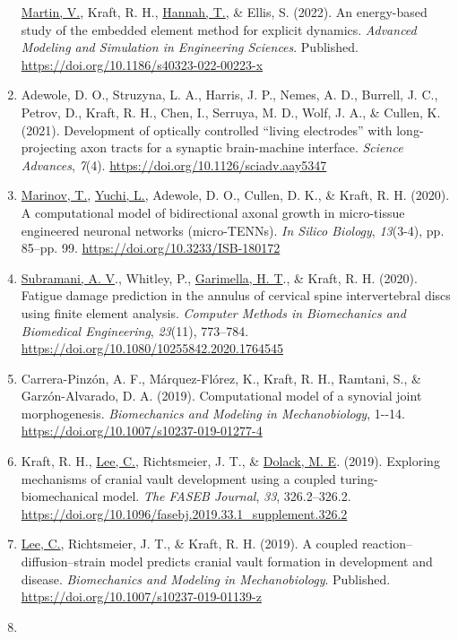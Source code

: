 \documentclass[11pt]{article}
\begin{document}
\begin{enumerate}
  \underline{Martin, V.}, Kraft, R. 
H., \underline{Hannah, T.}, \& Ellis, S. 
(2022). 
An
  energy-based study of the embedded element method for explicit
  dynamics. 
\emph{Advanced Modeling and Simulation in Engineering
  Sciences}. 
Published. 
\url{https://doi.org/10.1186/s40323-022-00223-x}
\item
  Adewole, D. 
O., Struzyna, L. 
A., Harris, J. 
P., Nemes, A. 
D., Burrell,
  J. 
C., Petrov, D., Kraft, R. 
H., Chen, I., Serruya, M. 
D., Wolf, J.
  A., \& Cullen, K. 
(2021). 
Development of optically controlled ``living
  electrodes'' with long-projecting axon tracts for a synaptic
  brain-machine interface. 
\emph{Science Advances}, \emph{7}(4).
  \url{https://doi.org/10.1126/sciadv.aay5347}
\item
  \underline{Marinov, T.}, \underline{Yuchi, L.}, Adewole, D. 
O., Cullen, D. 
K., \& Kraft, R. 
H.
  (2020). 
A computational model of bidirectional axonal growth in
  micro-tissue engineered neuronal networks (micro-TENNs). 
\emph{In
  Silico Biology}, \emph{13}(3-4), pp. 
85--pp. 
99.
  \url{https://doi.org/10.3233/ISB-180172}
\item
  \underline{Subramani, A. 
V}., Whitley, P., \underline{Garimella, H. 
T}., \& Kraft, R. 
H.
  (2020). 
Fatigue damage prediction in the annulus of cervical spine
  intervertebral discs using finite element analysis. 
\emph{Computer
  Methods in Biomechanics and Biomedical Engineering}, \emph{23}(11),
  773--784. 
\url{https://doi.org/10.1080/10255842.2020.1764545}
\item
  Carrera-Pinzón, A. 
F., Márquez-Flórez, K., Kraft, R. 
H., Ramtani, S.,
  \& Garzón-Alvarado, D. 
A. 
(2019). 
Computational model of a synovial
  joint morphogenesis. 
\emph{Biomechanics and Modeling in
  Mechanobiology}, 1-\/-14.
  \url{https://doi.org/10.1007/s10237-019-01277-4}
\item
  Kraft, R. 
H., \underline{Lee, C.}, Richtsmeier, J. 
T., \& \underline{Dolack, M. 
E}. 
(2019).
  Exploring mechanisms of cranial vault development using a coupled
  turing-biomechanical model. 
\emph{The FASEB Journal}, \emph{33},
  326.2--326.2.
  \url{https://doi.org/10.1096/fasebj.2019.33.1_supplement.326.2}
\item
  \underline{Lee, C.}, Richtsmeier, J. 
T., \& Kraft, R. 
H. 
(2019). 
A coupled
  reaction--diffusion--strain model predicts cranial vault formation in
  development and disease. 
\emph{Biomechanics and Modeling in
  Mechanobiology}. 
Published.
  \url{https://doi.org/10.1007/s10237-019-01139-z}
\item

\end{enumerate}
\end{document}
